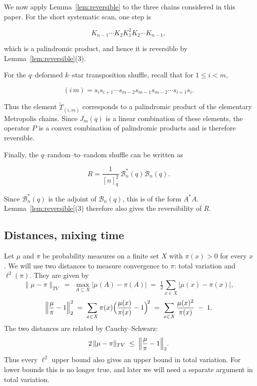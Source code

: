 \documentclass[11pt]{article}
\theoremstyle{plain}  %
\begin{document}
We now apply Lemma~\ref{lem:reversible} to the three chains considered in this
paper. For the short systematic scan, one step is

$$
    K_{n-1}\cdots K_2K_1^2K_2\cdots K_{n-1},
$$

which is a palindromic product, and hence it is reversible by
Lemma~\ref{lem:reversible}(3).

For the $q$--deformed $k$--star transposition shuffle, recall that for
$1\leq i<m$,

$$
    (i\,m)
    =
    s_i s_{i+1}\cdots s_{m-2}s_{m-1}
    s_{m-2}\cdots s_{i+1}s_i.
$$

Thus the element $\widetilde T_{(i,m)}$ corresponds to a palindromic
product of the elementary Metropolis chains. Since $J_m(q)$ is a linear
combination of these elements, the operator $P$ is a convex combination
of palindromic products and is therefore reversible.

Finally, the $q$--random--to--random shuffle can be written as

$$
    R
    =
    \frac{1}{[n]_q^2}\,
    \mathcal B_n^*(q)\mathcal B_n(q).
$$

Since $\mathcal B_n^*(q)$ is the adjoint of $\mathcal B_n(q)$, this is of
the form $A^*A$. Lemma~\ref{lem:reversible}(3) therefore also gives the
reversibility of $R$.


\subsection{Distances, mixing time}\label{sec:distances}

Let $\mu$ and $\pi$ be probability measures on a finite set $X$ with $\pi(x)>0$
for every $x$. We will use two distances to measure convergence to $\pi$: total
variation and $\ell^{2}(\pi)$. They are given by
$$
  \|\mu-\pi\|_{TV}
  \;=\; \max_{A \subseteq X}\bigl|\mu(A)-\pi(A)\bigr|
  \;=\; \tfrac12\sum_{x \in X}\bigl|\mu(x)-\pi(x)\bigr|,
$$
$$
  \Bigl\|\frac{\mu}{\pi}-1\Bigr\|_{2}^{2}
  \;=\; \sum_{x \in X}\pi(x)\Bigl(\frac{\mu(x)}{\pi(x)}-1\Bigr)^{\!2}
  \;=\; \sum_{x \in X}\frac{\mu(x)^{2}}{\pi(x)} \;-\; 1 .
$$
The two distances are related by Cauchy--Schwarz:
\begin{equation}\label{eq:tvl2}
  2\,\|\mu-\pi\|_{TV} \;\le\; \Bigl\|\frac{\mu}{\pi}-1\Bigr\|_{2}.
\end{equation}
Thus every $\ell^{2}$ upper bound also gives an upper bound in total variation.
For lower bounds this is no longer true, and later we will need a separate
argument in total variation.
\end{document}
